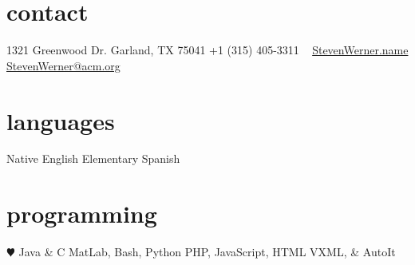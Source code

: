 \documentclass[]{friggeri-cv} %
\begin{document}


\begin{aside1} 
\section{contact}
1321 Greenwood Dr.
Garland, TX 75041
+1 (315) 405-3311
~
\href{http://www.StevenWerner.name}{StevenWerner.name}
\href{mailto:StevenWerner@acm.org}{StevenWerner@acm.org}
\section{languages}
Native English
Elementary Spanish
\section{programming}
{\color{red} $\varheartsuit$} Java \& C
MatLab,  Bash, Python
PHP, JavaScript, HTML
VXML, \& AutoIt %
\end{aside1}

\end{document}
